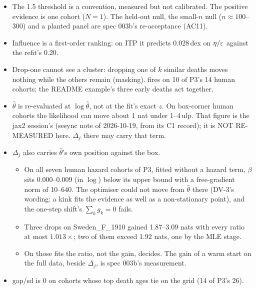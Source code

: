 \begin{itemize}[nosep]
  \item The 1.5 threshold is a convention, measured but not calibrated. The positive evidence is one cohort ($N=1$).
    The held-out null, the small-$n$ null ($n\approx100$--300) and a planted panel are spec 003b's re-acceptance
    (AC11).
  \item Influence is a first-order ranking: on ITP it predicts 0.028\,dex on $\eta/\varepsilon$ against the refit's 0.20.
  \item Drop-one cannot see a cluster: dropping one of $k$ similar deaths moves nothing while the others remain
    (masking).  fires on 10 of P3's 14 human cohorts; the README example's three early deaths act
    together.
  \item $\hat\theta$ is re-evaluated at $\log\hat\theta$, not at the fit's exact $z$. On box-corner human cohorts the
    likelihood can move about 1 nat under 1--4\,ulp. That figure is the jax2 session's (sesync note of 2026-10-19,
    from its C1 record); it is NOT RE-MEASURED here. $\Delta_j$ there may carry that term.
  \item $\Delta_j$ also carries $\hat\theta$'s own position against the box.
    \begin{itemize}[nosep]
      \item On all seven human hazard cohorts of P3, fitted without a hazard term, $\beta$ sits 0.000--0.009 (in
        $\log$) below its upper bound with a free-gradient norm of 10--640. The optimiser could not move from
        $\hat\theta$ there (DV-3's wording: a kink fits the evidence as well as a non-stationary point), and the
        one-step shift's $\sum_k g_k=0$ fails.
      \item Three drops on Sweden\_F\_1910 gained 1.87--3.09 nats with every ratio at most $1.013\times$; two of them
        exceed 1.92 nats, one by the MLE stage.
      \item On those fits the ratio, not the gain, decides. The gain of a warm start on the full data, beside
        $\Delta_j$, is spec 003b's measurement.
    \end{itemize}
  \item gap/sd is $0$ on cohorts whose top death ages tie on the grid (14 of P3's 26).
\end{itemize}
